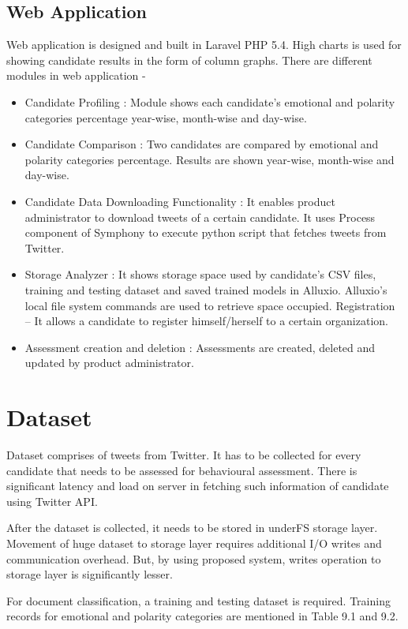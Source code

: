 \documentclass[oneside,a4paper,12pt]{pictreport}
\begin{document}
\subsection{Web Application}
Web application is designed and built in Laravel PHP 5.4. High charts is used for showing candidate results in the form of column graphs. There are different modules in web application - 
\begin{itemize}
\item Candidate Profiling : Module shows each candidate's emotional and polarity categories percentage year-wise, month-wise and day-wise.
\item Candidate Comparison : Two candidates are compared by emotional and polarity categories percentage. Results are shown year-wise, month-wise and day-wise.
\item Candidate Data Downloading Functionality : It enables product administrator to download tweets of a certain candidate. It uses Process component of Symphony to execute python script that fetches tweets from Twitter.
\item Storage Analyzer : It shows storage space used by candidate's CSV files, training and testing dataset and saved trained models in Alluxio. Alluxio's local file system commands are used to retrieve space occupied. 
Registration – It allows a candidate to register himself/herself to a certain organization. 
\item Assessment creation and deletion : Assessments are created, deleted and updated by product administrator. 
\end{itemize}

\section{Dataset}
\hspace{1.1cm}Dataset comprises of tweets from Twitter. It has to be collected for every candidate that needs to be assessed for behavioural assessment. There is significant latency and load on server in fetching such information of candidate using Twitter API.
\par After the dataset is collected, it needs to be stored in underFS storage layer. Movement of huge dataset to storage layer requires additional I/O writes and communication overhead. But, by using proposed system, writes operation to storage layer is significantly lesser.
\par For document classification, a training and testing dataset is required. Training records for emotional and polarity categories are mentioned in Table 9.1 and 9.2.
\end{document}
